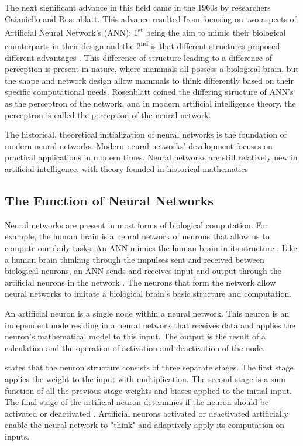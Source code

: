 The next significant advance in this field came in the 1960s by researchers Caianiello and Rosenblatt. This advance resulted from focusing on two aspects of Artificial Neural Network's (ANN): 1\textsuperscript{st} being the aim to mimic their biological counterparts in their design and the 2\textsuperscript{nd} is that different structures proposed different advantages \citep{Mueller1995}. This difference of structure leading to a difference of perception is present in nature, where mammals all possess a biological brain, but the shape and network design allow mammals to think differently based on their specific computational needs\citep{Mueller1995}. Rosenblatt coined the differing structure of ANN's as the perceptron of the network, and in modern artificial intelligence theory, the perceptron is called the perception of the neural network.

The historical, theoretical initialization of neural networks is the foundation of modern neural networks. Modern neural networks' development focuses on practical applications in modern times. Neural networks are still relatively new in artificial intelligence, with theory founded in historical mathematics

\subsection{The Function of Neural Networks}

Neural networks are present in most forms of biological computation. For example, the human brain is a neural network of neurons that allow us to compute our daily tasks. An ANN mimics the human brain in its structure \citep{Krenker2011}. Like a human brain thinking through the impulses sent and received between biological neurons, an ANN sends and receives input and output through the artificial neurons in the network \citep{Krenker2011}. The neurons that form the network allow neural networks to imitate a biological brain's basic structure and computation. 

An artificial neuron is a single node within a neural network. This neuron is an independent node residing in a neural network that receives data and applies the neuron's mathematical model to this input. The output is the result of a calculation and the operation of activation and deactivation of the node.

\cite{Krenker2011} states that the neuron structure consists of three separate stages. The first stage applies the weight to the input with multiplication. The second stage is a sum function of all the previous stage weights and biases applied to the initial input. The final stage of the artificial neuron determines if the neuron should be activated or deactivated \citep{Krenker2011}. Artificial neurons activated or deactivated artificially enable the neural network to "think" and adaptively apply its computation on inputs.

